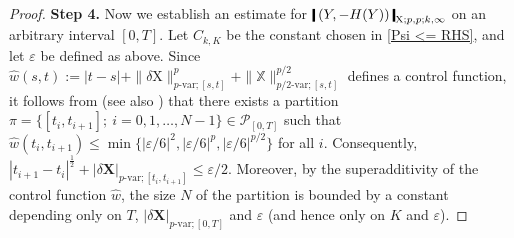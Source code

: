 \documentclass[11pt,reqno]{amsart}
\numberwithin{equation}{section}
\newcommand{\shortthickbar}{%
  \vcenter{\hbox{\rule{1.8pt}{2.2ex}}}%
}
\newcommand{\thicknm}[1]{%
  \mathopen{\shortthickbar}%
  \mkern4mu #1 \mkern4mu%
  \mathclose{\shortthickbar}%
}
\begin{document}
\begin{proof}
{\bf Step 4.}
Now we establish an estimate for $\thicknm{(Y,-H(Y))}_{\mathrm X;p,p;k,\infty}$  on an arbitrary interval $[0,T]$. 
Let $C_{k,K}$ be the constant chosen in \eqref{Psi <= RHS}, and let $\varepsilon$ be defined as above. Since $\hat w(s,t) := |t-s| + \|\delta \mathrm X\|^p_{p\text{-}\mathrm{var};[s,t]} + \|\mathbb X\|^{p/2}_{p/2\text{-}\mathrm{var};[s,t]}$ defines a control function, it follows from  \cite[Lemma~1.5]{FrizZhang-2018} (see also \cite[Lemma~2.4]{li2024reflected}) that  there exists a partition  
$
\pi = \{[t_i,t_{i+1}];\ i=0,1,\dots,N-1\}\in\mathcal P_{[0,T]}
$
such that $\hat w(t_i,t_{i+1}) \le \min\{|\varepsilon/6|^{2},|\varepsilon/6|^{p},|\varepsilon/6|^{p/2}\}$ for all $i$. Consequently, $|t_{i+1} - t_{i}|^{\frac{1}{2}} + |\delta \mathbf X|_{p\text{-}\mathrm{var};[t_{i},t_{i+1}]} \le \varepsilon/2$. Moreover, by the superadditivity of the control function $\hat w$, the size $N$ of the partition is bounded by a constant depending only on $T$, $|\delta \mathbf X|_{p\text{-}\mathrm{var};[0,T]}$ and $\varepsilon$ (and hence only on $K$ and $\varepsilon$).


\end{proof}
\end{document}
